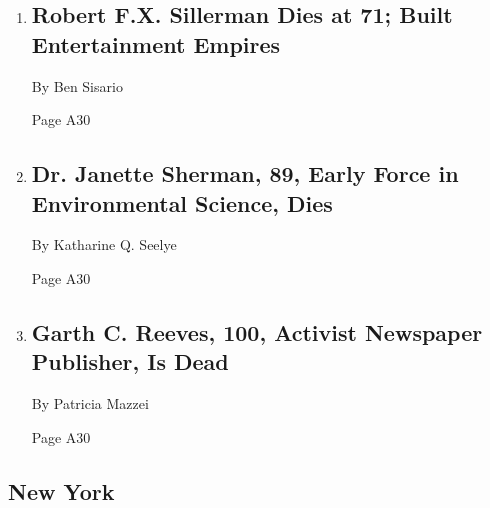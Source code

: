 \begin{enumerate}
\def\labelenumi{\arabic{enumi}.}
\item
  \href{/2019/11/28/arts/music/robert-fx-sillerman-dead.html}{}

  \hypertarget{robert-fx-sillerman-dies-at-71-built-entertainment-empires}{%
  \subsection{Robert F.X. Sillerman Dies at 71; Built Entertainment
  Empires}\label{robert-fx-sillerman-dies-at-71-built-entertainment-empires}}

  By Ben Sisario

  Page A30
\item
  \href{/2019/11/29/health/dr-janette-sherman-dead.html}{}

  \hypertarget{dr-janette-sherman-89-early-force-in-environmental-science-dies}{%
  \subsection{Dr. Janette Sherman, 89, Early Force in Environmental
  Science,
  Dies}\label{dr-janette-sherman-89-early-force-in-environmental-science-dies}}

  By Katharine Q. Seelye

  Page A30
\item
  \href{/2019/11/28/obituaries/garth-c-reeves-sead.html}{}

  \hypertarget{garth-c-reeves-100-activist-newspaper-publisher-is-dead}{%
  \subsection{Garth C. Reeves, 100, Activist Newspaper Publisher, Is
  Dead}\label{garth-c-reeves-100-activist-newspaper-publisher-is-dead}}

  By Patricia Mazzei

  Page A30
\end{enumerate}

\hypertarget{new-york}{%
\subsection{New York}\label{new-york}}

